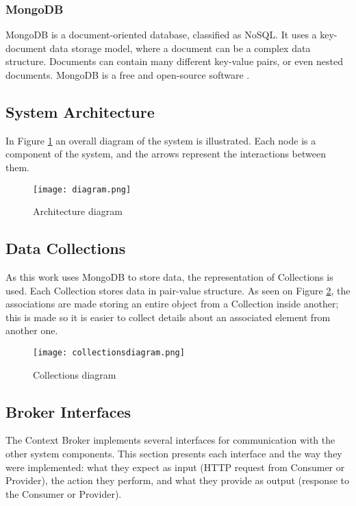 \subsubsection{MongoDB}
MongoDB is a document-oriented database, classified as NoSQL. It uses a key-document data storage model, where a document can be a complex data structure. Documents can contain many different key-value pairs, or even nested documents. MongoDB is a free and open-source software \cite{mongodb}.


\subsection{System Architecture}
In Figure \ref{fig:diagram} an overall diagram of the system is illustrated. Each node is a component of the system, and the arrows represent the interactions between them.

\begin{figure}[h]
	\centering
	\texttt{[image: diagram.png]}
	\caption{Architecture diagram}
	\label{fig:diagram}
	
\end{figure}

\subsection{Data Collections}

As this work uses MongoDB to store data, the representation of Collections is used. Each Collection stores data in pair-value structure. As seen on Figure \ref{fig:collectionsdiagram}, the associations are made storing an entire object from a Collection inside another; this is made so it is easier to collect details about an associated element from another one.

\begin{figure}[h]
	\centering
	\texttt{[image: collectionsdiagram.png]}
	\caption{Collections diagram}
	\label{fig:collectionsdiagram}
	
\end{figure}



\subsection{Broker Interfaces}
The Context Broker implements several interfaces for communication with the other system components. This section presents each interface and the way they were implemented: what they expect as input (HTTP request from Consumer or Provider), the action they perform, and what they provide as output (response to the Consumer or Provider).



